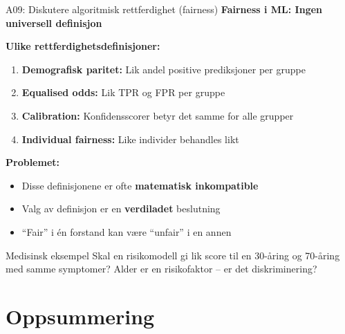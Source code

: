 \documentclass[aspectratio=169, 10pt]{beamer}
\begin{document}
\begin{frame}{A09: Diskutere algoritmisk rettferdighet (fairness)}
    \textbf{Fairness i ML: Ingen universell definisjon}
    
    \vspace{0.3cm}
    \textbf{Ulike rettferdighetsdefinisjoner:}
    \begin{enumerate}
        \item \textbf{Demografisk paritet:} Lik andel positive prediksjoner per gruppe
        \item \textbf{Equalised odds:} Lik TPR og FPR per gruppe
        \item \textbf{Calibration:} Konfidensscorer betyr det samme for alle grupper
        \item \textbf{Individual fairness:} Like individer behandles likt
    \end{enumerate}
    
    \vspace{0.3cm}
    \textbf{Problemet:}
    \begin{itemize}
        \item Disse definisjonene er ofte \textbf{matematisk inkompatible}
        \item Valg av definisjon er en \textbf{verdiladet} beslutning
        \item ``Fair'' i én forstand kan være ``unfair'' i en annen
    \end{itemize}
    
    \vspace{0.3cm}
    \begin{block}{Medisinsk eksempel}
        Skal en risikomodell gi lik score til en 30-åring og 70-åring med samme symptomer? Alder er en risikofaktor -- er det diskriminering?
    \end{block}
\end{frame}

\section*{Oppsummering}
\end{document}
